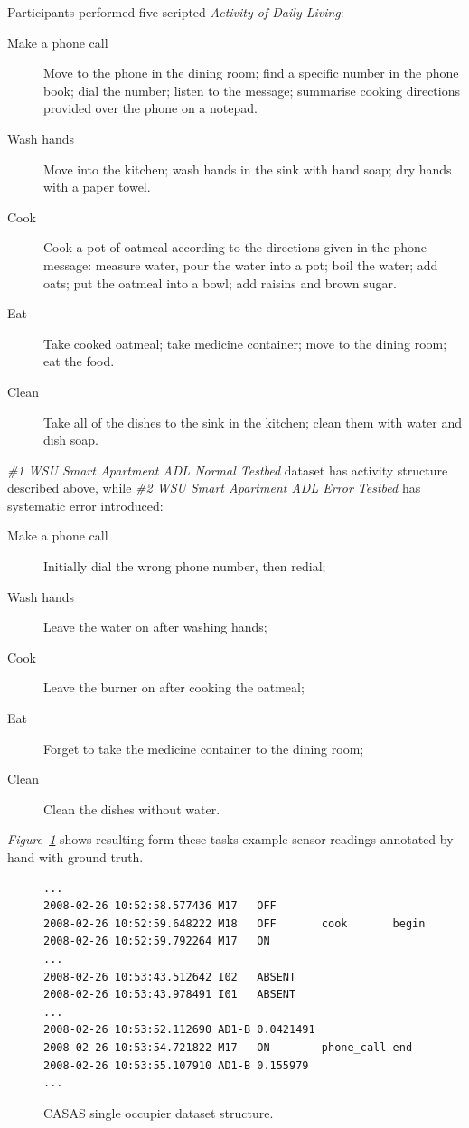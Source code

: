 \documentclass[11pt, a4paper, pdflatex, leqno, twoside, openright]{report}
\begin{document}
Participants performed five scripted \emph{Activity of Daily Living}:
\begin{description}
\item[Make a phone call] Move to the phone in the dining room; find a specific number in the phone book; dial the number; listen to the message; summarise cooking directions provided over the phone on a notepad.
\item[Wash hands] Move into the kitchen; wash hands in the sink with hand soap; dry hands with a paper towel.
\item[Cook] Cook a pot of oatmeal according to the directions given in the phone message: measure water, pour the water into a pot; boil the water; add oats; put the oatmeal into a bowl; add raisins and brown sugar.
\item[Eat] Take cooked oatmeal; take medicine container; move to the dining room; eat the food.
\item[Clean] Take all of the dishes to the sink in the kitchen; clean them with water and dish soap.
\end{description}

\emph{\#1 WSU Smart Apartment ADL Normal Testbed} dataset has activity structure described above, while \emph{\#2 WSU Smart Apartment ADL Error Testbed} has systematic error introduced:
\begin{description}
\item[Make a phone call] Initially dial the wrong phone number, then redial;
\item[Wash hands] Leave the water on after washing hands;
\item[Cook] Leave the burner on after cooking the oatmeal;
\item[Eat] Forget to take the medicine container to the dining room;
\item[Clean] Clean the dishes without water.
\end{description}

\emph{Figure~\ref{lst:CASASoneR}} shows resulting form these tasks example sensor readings annotated by hand with ground truth.
\begin{figure}[htb]
  \begin{lstlisting}
...
2008-02-26 10:52:58.577436 M17   OFF
2008-02-26 10:52:59.648222 M18   OFF       cook       begin
2008-02-26 10:52:59.792264 M17   ON
...
2008-02-26 10:53:43.512642 I02   ABSENT
2008-02-26 10:53:43.978491 I01   ABSENT
...
2008-02-26 10:53:52.112690 AD1-B 0.0421491
2008-02-26 10:53:54.721822 M17   ON        phone_call end
2008-02-26 10:53:55.107910 AD1-B 0.155979
...
  \end{lstlisting}
  \caption{CASAS single occupier dataset structure.\label{lst:CASASoneR}}
\end{figure}
\end{document}
